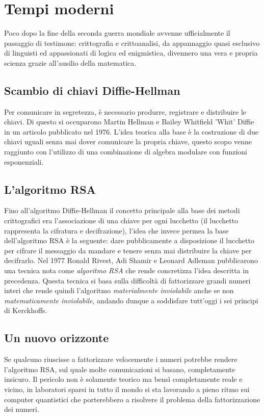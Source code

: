 \documentclass[a4paper, 12pt]{article}
\begin{document}
\section{Tempi moderni}
Poco dopo la fine della seconda guerra mondiale avvenne ufficialmente il passaggio di testimone: crittografia e crittoanalisi, da appannaggio quasi esclusivo di linguisti ed appassionati di logica ed enigmistica, divennero una vera e propria scienza grazie all'ausilio della matematica.
\subsection{Scambio di chiavi Diffie-Hellman}
Per comunicare in segretezza, è necessario produrre, registrare e distribuire le chiavi. Di questo si occuparono Martin Hellman e Bailey Whitfield 'Whit' Diffie in un articolo pubblicato nel 1976. L'idea teorica alla base è la costruzione di due chiavi uguali senza mai dover comunicare la propria chiave, questo scopo venne raggiunto con l'utilizzo di una combinazione di algebra modulare con funzioni esponenziali.
\subsection{L'algoritmo RSA}
Fino all'algoritmo Diffie-Hellman il concetto principale alla base dei metodi crittografici era l'associazione di una chiave per ogni lucchetto (il lucchetto rappresenta la cifratura e decifrazione), l'idea che invece permea la base dell'algoritmo RSA è la seguente: dare pubblicamente a disposizione il lucchetto per cifrare il messaggio da mandare e tenere senza mai distribuire la chiave per decifrarlo.\newline
Nel 1977 Ronald Rivest, Adi Shamir e Leonard Adleman pubblicarono una tecnica nota come \textit{algoritmo RSA} che rende concretizza l'idea descritta in precedenza. Questa tecnica si basa sulla difficoltà di fattorizzare grandi numeri interi che rende quindi l'algoritmo \textit{materialmente inviolabile} anche se non \textit{matematicamente inviolabile}, andando dunque a soddisfare tutt'oggi i sei principi di Kerckhoffs.
\subsection{Un nuovo orizzonte}
Se qualcuno riuscisse a fattorizzare velocemente i numeri potrebbe rendere l'algoritmo RSA, sul quale molte comunicazioni si basano, completamente insicuro.
Il pericolo non è solamente teorico ma bensì completamente reale e vicino, in laboratori sparsi in tutto il mondo si sta lavorando a pieno ritmo sui computer quantistici che porterebbero a risolvere il problema della fattorizzazione dei numeri.
\end{document}
